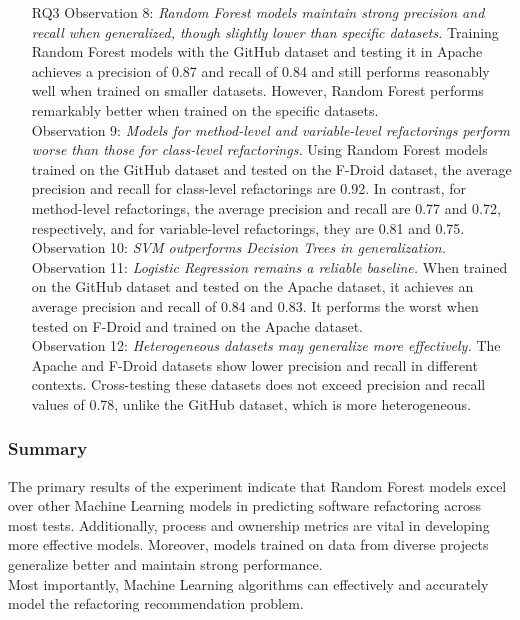 \begin{itemize}
    \item[RQ3] Observation 8: \textit{Random Forest models maintain strong precision and recall when generalized, though slightly lower than specific datasets.} Training Random Forest models with the GitHub dataset and testing it in Apache achieves a precision of 0.87 and recall of 0.84 and still performs reasonably well when trained on smaller datasets. However, Random Forest performs remarkably better when trained on the specific datasets.\\Observation 9: \textit{Models for method-level and variable-level refactorings perform worse than those for class-level refactorings.} Using Random Forest models trained on the GitHub dataset and tested on the F-Droid dataset, the average precision and recall for class-level refactorings are 0.92. In contrast, for method-level refactorings, the average precision and recall are 0.77 and 0.72, respectively, and for variable-level refactorings, they are 0.81 and 0.75.\\ Observation 10: \textit{SVM outperforms Decision Trees in generalization.}\\ Observation 11: \textit{Logistic Regression remains a reliable baseline.} When trained on the GitHub dataset and tested on the Apache dataset, it achieves an average precision and recall of 0.84 and 0.83. It performs the worst when tested on F-Droid and trained on the Apache dataset.\\ Observation 12: \textit{Heterogeneous datasets may generalize more effectively.} The Apache and F-Droid datasets show lower precision and recall in different contexts. Cross-testing these datasets does not exceed precision and recall values of 0.78, unlike the GitHub dataset, which is more heterogeneous.
\end{itemize}
\subsubsection{Summary}
The primary results of the experiment indicate that Random Forest models excel over other Machine Learning models in predicting software refactoring across most tests. Additionally, process and ownership metrics are vital in developing more effective models. Moreover, models trained on data from diverse projects generalize better and maintain strong performance.\\
Most importantly, Machine Learning algorithms can effectively and accurately model the refactoring recommendation problem.

